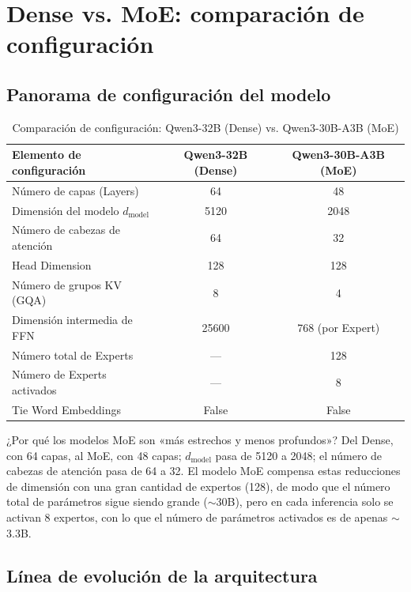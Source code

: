 \section{Dense vs. MoE: comparación de configuración}

\subsection{Panorama de configuración del modelo}

\begin{table}[H]
\centering
\caption{Comparación de configuración: Qwen3-32B (Dense) vs. Qwen3-30B-A3B (MoE)}
\begin{tabular}{lcc}
\toprule
\textbf{Elemento de configuración} & \textbf{Qwen3-32B (Dense)} & \textbf{Qwen3-30B-A3B (MoE)} \\
\midrule
Número de capas (Layers) & 64 & 48 \\
Dimensión del modelo $d_{\text{model}}$ & 5120 & 2048 \\
Número de cabezas de atención & 64 & 32 \\
Head Dimension & 128 & 128 \\
Número de grupos KV (GQA) & 8 & 4 \\
Dimensión intermedia de FFN & 25600 & 768 (por Expert) \\
Número total de Experts & — & 128 \\
Número de Experts activados & — & 8 \\
Tie Word Embeddings & False & False \\
\bottomrule
\end{tabular}
\end{table}

\begin{knowledgebox}{¿Por qué los modelos MoE son «más estrechos y menos profundos»?}
Del Dense, con 64 capas, al MoE, con 48 capas; $d_{\text{model}}$ pasa de 5120 a 2048; el número de cabezas de atención pasa de 64 a 32. El modelo MoE compensa estas reducciones de dimensión con una gran cantidad de expertos (128), de modo que el número total de parámetros sigue siendo grande ($\sim$30B), pero en cada inferencia solo se activan 8 expertos, con lo que el número de parámetros activados es de apenas $\sim$3.3B.
\end{knowledgebox}

\subsection{Línea de evolución de la arquitectura}

